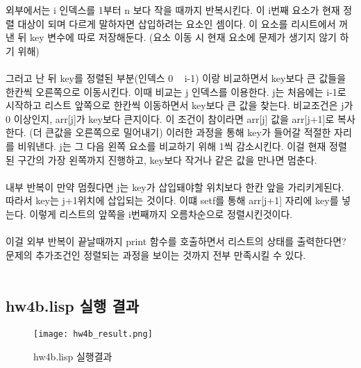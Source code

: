 \documentclass{article}
\begin{document}
외부에서는 i 인덱스를 1부터 n 보다 작을 때까지 반복시킨다. 이 i번째 요소가 현재 정렬 대상이 되며 다르게 말하자면 삽입하려는 요소인 셈이다. 이 요소를 리시트에서 꺼낸 뒤 key 변수에 따로 저장해둔다. (요소 이동 시 현재 요소에 문제가 생기지 않기 하기 위해) \\ \\

그러고 난 뒤 key를 정렬된 부분(인덱스 0 ~ i-1) 이랑 비교하면서 key보다 큰 값들을 한칸씩 오른쪽으로 이동시킨다. 이때 비교는 j 인덱스를 이용한다. j는 처음에는 i-1로 시작하고 리스트 앞쪽으로 한칸씩 이동하면서 key보다 큰 값을 찾는다. 비교조건은 j가 0 이상인지, arr[j]가 key보다 큰지이다. 이 조건이 참이라면 arr[j] 값을 arr[j+1]로 복사한다. (더 큰값을 오른쪽으로 밀어내기) 이러한 과정을 통해 key가 들어갈 적절한 자리를 비워낸다. j는 그 다음 왼쪽 요소를 비교하기 위해 1씩 감소시킨다. 이걸 현재 정렬된 구간의 가장 왼쪽까지 진행하고, key보다 작거나 같은 값을 만나면 멈춘다. \\ \\

내부 반복이 만약 멈췄다면 j는 key가 삽입돼야할 위치보다 한칸 앞을 가리키게된다. 따라서 key는 j+1위치에 삽입되는 것이다. 이떄 setf를 통해 arr[j+1] 자리에 key를 넣는다. 이렇게 리스트의 앞쪽을 i번째까지 오름차순으로 정렬시킨것이다. \\ \\

이걸 외부 반복이 끝날때까지 print 함수를 호출하면서 리스트의 상태를 출력한다면? 문제의 추가조건인 정렬되는 과정을 보이는 것까지 전부 만족시킬 수 있다. \\ \\




\newpage
\subsection{hw4b.lisp 실행 결과}

\begin{figure}[H]
    \centering
    \texttt{[image: hw4b\_result.png]}
    \caption{hw4b.lisp 실행결과}
    \label{fig:enter-label}
\end{figure}
\end{document}
